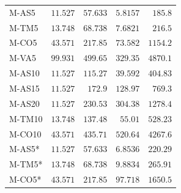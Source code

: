 \begin{longtable}{lrrrr}
M-AS5 & $11.527$ & $57.633$ & $5.8157$ & $185.8$ \\
M-TM5 & $13.748$ & $68.738$ & $7.6821$ & $216.5$ \\
M-CO5 & $43.571$ & $217.85$ & $73.582$ & $1154.2$ \\
M-VA5 & $99.931$ & $499.65$ & $329.35$ & $4870.1$ \\
M-AS10 & $11.527$ & $115.27$ & $39.592$ & $404.83$ \\
M-AS15 & $11.527$ & $172.9$ & $128.97$ & $769.3$ \\
M-AS20 & $11.527$ & $230.53$ & $304.38$ & $1278.4$ \\
M-TM10 & $13.748$ & $137.48$ & $55.01$ & $528.23$ \\
M-CO10 & $43.571$ & $435.71$ & $520.64$ & $4267.6$ \\
M-AS5* & $11.527$ & $57.633$ & $6.8536$ & $220.29$ \\
M-TM5* & $13.748$ & $68.738$ & $9.8834$ & $265.91$ \\
M-CO5* & $43.571$ & $217.85$ & $97.718$ & $1650.5$ \\
\hline\end{longtable}\endgroup
